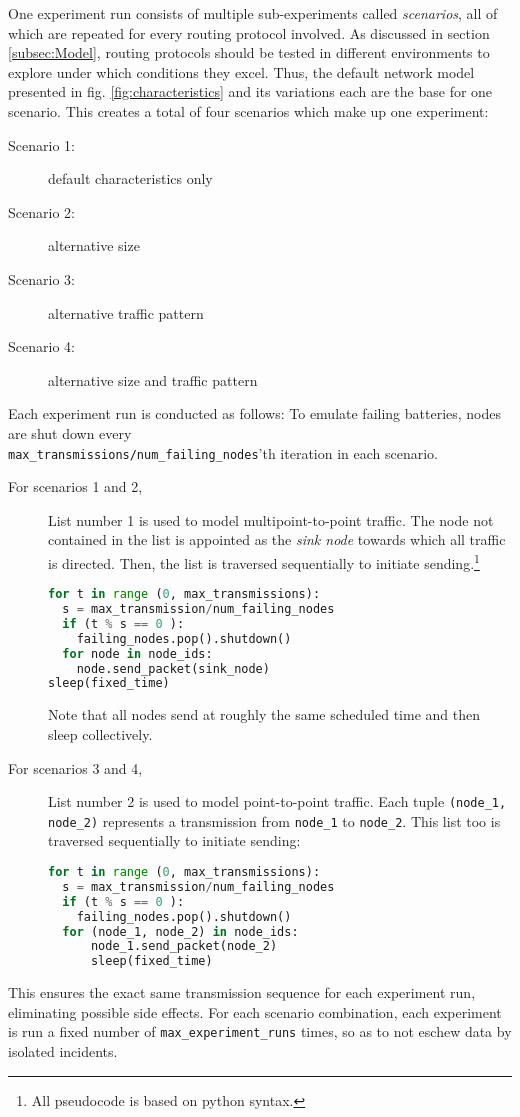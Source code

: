 \documentclass{acm_proc_article-sp}
\begin{document}
One experiment run consists of multiple sub-experiments called \emph{scenarios}, all of which are repeated for every routing protocol involved. As discussed in section \ref{subsec:Model}, routing protocols should be tested in different environments to explore under which conditions they excel. Thus, the default network model presented in fig. \ref{fig:characteristics} and its variations each are the base for one scenario. This creates a total of four scenarios which make up one experiment:
\begin{description}
\item[Scenario 1:] default characteristics only
\item[Scenario 2:] alternative size
\item[Scenario 3:] alternative traffic pattern
\item[Scenario 4:] alternative size and traffic pattern
\end{description}
Each experiment run is conducted as follows:
To emulate failing batteries, nodes are shut down every\\
\texttt{max\_transmissions/num\_failing\_nodes}'th iteration in each scenario.
\begin{description}
\item[For scenarios 1 and 2,] List number 1 is used to model multipoint-to-point traffic. The node not contained in the list is appointed as the \emph{sink node} towards which all traffic is directed. Then, the list is traversed sequentially to initiate sending.\footnote{All pseudocode is based on python syntax.} %
\begin{lstlisting}[language=python]
for t in range (0, max_transmissions):
  s = max_transmission/num_failing_nodes
  if (t % s == 0 ):
    failing_nodes.pop().shutdown()
  for node in node_ids:
    node.send_packet(sink_node)
sleep(fixed_time)
\end{lstlisting}
Note that all nodes send at roughly the same scheduled time and then sleep collectively.
\item[For scenarios 3 and 4,] List number 2 is used to model point-to-point traffic. Each tuple \texttt{(node\_1, node\_2)} represents a transmission from \texttt{node\_1} to \texttt{node\_2}. This list too is traversed sequentially to initiate sending:
\begin{lstlisting}[language=python]
for t in range (0, max_transmissions):
  s = max_transmission/num_failing_nodes
  if (t % s == 0 ):
    failing_nodes.pop().shutdown()
  for (node_1, node_2) in node_ids:
      node_1.send_packet(node_2)
      sleep(fixed_time)
\end{lstlisting}
\end{description}
This ensures the exact same transmission sequence for each experiment run, eliminating possible side effects.
For each scenario combination, each experiment is run a fixed number of \texttt{max\_experiment\_runs} times, so as to not eschew data by isolated incidents.
\end{document}
